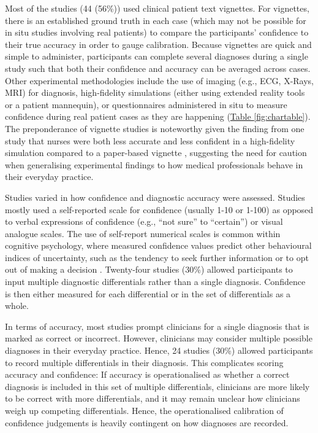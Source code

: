 \documentclass[a4paper, nobind]{templates/ociamthesis}
\begin{document}
\hfill\break
Most of the studies (44 (56\%)) used clinical patient text vignettes. For vignettes, there is an established ground truth in each case (which may not be possible for in situ studies involving real patients) to compare the participants' confidence to their true accuracy in order to gauge calibration. Because vignettes are quick and simple to administer, participants can complete several diagnoses during a single study such that both their confidence and accuracy can be averaged across cases. Other experimental methodologies include the use of imaging (e.g., ECG, X-Rays, MRI) for diagnosis, high-fidelity simulations (either using extended reality tools or a patient mannequin), or questionnaires administered in situ to measure confidence during real patient cases as they are happening (\hyperref[fig:chartable]{Table \ref{fig:chartable}}). The preponderance of vignette studies is noteworthy given the finding from one study that nurses were both less accurate and less confident in a high-fidelity simulation compared to a paper-based vignette \autocite{yang_effect_2012}, suggesting the need for caution when generalising experimental findings to how medical professionals behave in their everyday practice.

\hfill\break
Studies varied in how confidence and diagnostic accuracy were assessed. Studies mostly used a self-reported scale for confidence (usually 1-10 or 1-100) as opposed to verbal expressions of confidence (e.g., ``not sure'' to ``certain'') or visual analogue scales. The use of self-report numerical scales is common within cognitive psychology, where measured confidence values predict other behavioural indices of uncertainty, such as the tendency to seek further information or to opt out of making a decision \autocite{gherman_neural_2015}. Twenty-four studies (30\%) allowed participants to input multiple diagnostic differentials rather than a single diagnosis. Confidence is then either measured for each differential or in the set of differentials as a whole.

\hfill\break
In terms of accuracy, most studies prompt clinicians for a single diagnosis that is marked as correct or incorrect. However, clinicians may consider multiple possible diagnoses in their everyday practice. Hence, 24 studies (30\%) allowed participants to record multiple differentials in their diagnosis. This complicates scoring accuracy and confidence: If accuracy is operationalised as whether a correct diagnosis is included in this set of multiple differentials, clinicians are more likely to be correct with more differentials, and it may remain unclear how clinicians weigh up competing differentials. Hence, the operationalised calibration of confidence judgements is heavily contingent on how diagnoses are recorded.
\end{document}
